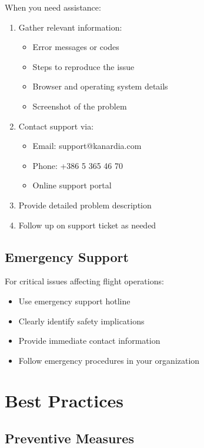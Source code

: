 When you need assistance:

\begin{enumerate}
    \item Gather relevant information:
    \begin{itemize}
        \item Error messages or codes
        \item Steps to reproduce the issue
        \item Browser and operating system details
        \item Screenshot of the problem
    \end{itemize}
    \item Contact support via:
    \begin{itemize}
        \item Email: support@kanardia.com
        \item Phone: +386 5 365 46 70
        \item Online support portal
    \end{itemize}
    \item Provide detailed problem description
    \item Follow up on support ticket as needed
\end{enumerate}

\subsection{Emergency Support}

For critical issues affecting flight operations:

\begin{itemize}
    \item Use emergency support hotline
    \item Clearly identify safety implications
    \item Provide immediate contact information
    \item Follow emergency procedures in your organization
\end{itemize}

\section{Best Practices}

\subsection{Preventive Measures}

